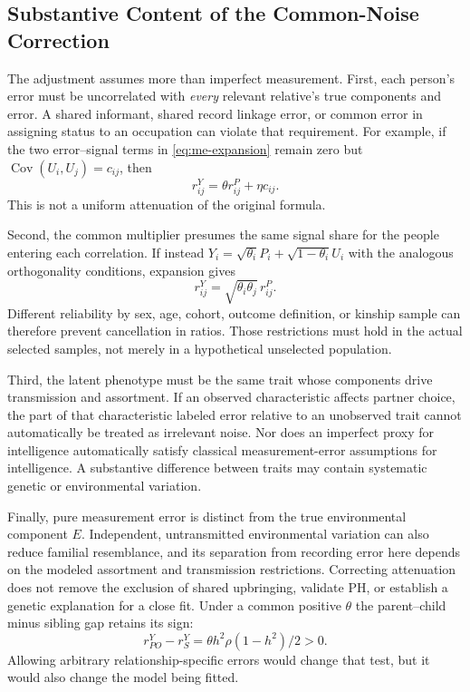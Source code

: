 \subsection{Substantive Content of the Common-Noise Correction}
\label{sec:me-meaning}

The adjustment assumes more than imperfect measurement. First, each
person's error must be uncorrelated with \emph{every} relevant relative's
true components and error. A shared informant, shared record linkage
error, or common error in assigning status to an occupation can violate
that requirement. For example, if the two error--signal terms in
\eqref{eq:me-expansion} remain zero but
$\operatorname{Cov}(U_i,U_j)=c_{ij}$, then
\[
 r^Y_{ij}=\theta r^P_{ij}+\eta c_{ij}.
\]
This is not a uniform attenuation of the original formula.

Second, the common multiplier presumes the same signal share for the
people entering each correlation. If instead
$Y_i=\sqrt{\theta_i}P_i+\sqrt{1-\theta_i}U_i$ with the analogous
orthogonality conditions, expansion gives
\[
 r^Y_{ij}=\sqrt{\theta_i\theta_j}\,r^P_{ij}.
\]
Different reliability by sex, age, cohort, outcome definition, or kinship
sample can therefore prevent cancellation in ratios. Those restrictions
must hold in the actual selected samples, not merely in a hypothetical
unselected population.

Third, the latent phenotype must be the same trait whose components
drive transmission and assortment. If an observed characteristic
affects partner choice, the part of that characteristic labeled error
relative to an unobserved trait cannot automatically be treated as
irrelevant noise. Nor does an imperfect proxy for intelligence
automatically satisfy classical measurement-error assumptions for
intelligence. A substantive difference between traits may contain
systematic genetic or environmental variation.

Finally, pure measurement error is distinct from the true environmental
component $E$. Independent, untransmitted environmental variation can
also reduce familial resemblance, and its separation from recording
error here depends on the modeled assortment and transmission
restrictions. Correcting attenuation does not remove the exclusion
of shared upbringing, validate PH, or establish a genetic explanation
for a close fit. Under a common positive $\theta$ the parent--child
minus sibling gap retains its sign:
\[
 r^Y_{PO}-r^Y_S
 =\theta h^2\rho(1-h^2)/2>0.
\]
Allowing arbitrary relationship-specific errors would change that test,
but it would also change the model being fitted.

